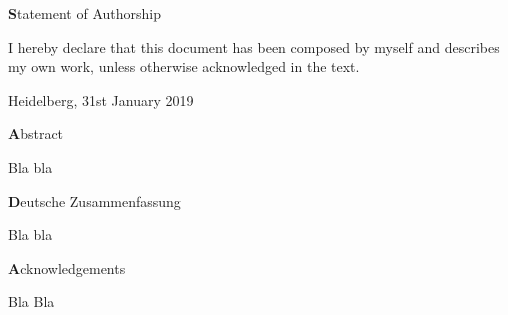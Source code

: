 \documentclass{thesisclass}
\begin{document}

\frontmatter
{}

\blankpage


\thispagestyle{plain}

\vspace*{\fill}

\centerline{\textbf Statement of Authorship}

\vspace{0.25cm}

I hereby declare that this document has been composed by myself and describes my own work, unless otherwise acknowledged in the text.

\vspace{2.5cm}

\hspace{0.25cm} Heidelberg, 31st January 2019

\vspace{2cm}

\blankpage


\thispagestyle{plain}

\begin{addmargin}{0.5cm}

\centerline{\textbf Abstract}


Bla bla

\vskip 2cm

\centerline{\textbf Deutsche Zusammenfassung}


Bla bla

\vskip 2cm

\newpage

\centerline{\textbf Acknowledgements}

Bla Bla

\end{addmargin}

\blankpage


\tableofcontents
\blankpage

\end{document}
